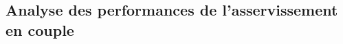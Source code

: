 %
%
%
%
%
%
%
%

\subsection*{Analyse des performances de l'asservissement en couple}
\ifprof
\else

